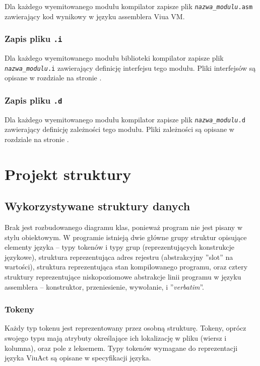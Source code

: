 \documentclass[11pt,oneside,a4paper,titlepage,onecolumn]{article}
\begin{document}
Dla każdego wyemitowanego modułu kompilator zapisze plik \texttt{\emph{nazwa\_modulu}.asm} zawierający kod
wynikowy w języku assemblera Viua VM.

\subsubsection{Zapis pliku \texttt{.i}}

Dla każdego wyemitowanego modułu biblioteki kompilator zapisze plik \texttt{\emph{nazwa\_modulu}.i}
zawierający definicję interfejsu tego modułu. Pliki interfejsów są opisane w rozdziale
 na stronie \pageref{pliki_interfejsow_modulow}.

\subsubsection{Zapis pliku \texttt{.d}}

Dla każdego wyemitowanego modułu kompilator zapisze plik \texttt{\emph{nazwa\_modulu}.d}
zawierający definicję zależności tego modułu. Pliki zależności są opisane w rozdziale
 na stronie \pageref{pliki_zaleznosci_modulow}.

\newpage
\section{Projekt struktury}

\subsection{Wykorzystywane struktury danych}

Brak jest rozbudowanego diagramu klas, ponieważ program nie jest pisany w stylu obiektowym.
W programie istnieją dwie główne grupy struktur opisujące elementy języka -- typy tokenów i typy grup
(reprezentujących konstrukcje językowe), struktura reprezentująca adres rejestru (abstrakcyjny ''slot'' na
wartości), struktura reprezentująca stan kompilowanego programu, oraz cztery struktury reprezentujące
niskopoziomowe abstrakcje linii programu w języku assemblera -- konstruktor, przeniesienie, wywołanie, i
''\emph{verbatim}''.

\subsubsection{Tokeny}
\label{diagram_klas_tokeny}

Każdy typ tokenu jest reprezentowany przez osobną strukturę. Tokeny, oprócz swojego typu mają atrybuty
określające ich lokalizację w pliku (wiersz i kolumna), oraz pole z leksemem. Typy tokenów wymagane do
reprezentacji języka ViuAct są opisane w specyfikacji języka.
\end{document}
